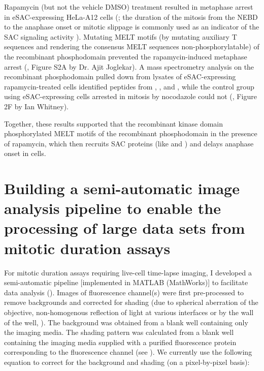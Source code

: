 Rapamycin (but not the vehicle DMSO) treatment resulted in metaphase arrest in eSAC-expressing HeLa-A12 cells (; the duration of the mitosis from the NEBD to the anaphase onset or mitotic slippage is commonly used as an indicator of the SAC signaling activity \cite{RiederNormalProgression, Rheostat, Ablation}). Mutating MELT motifs (by mutating auxiliary T\textOmega{} sequences \cite{RecombinantKNL1, MELTActivity} and rendering the consensus MELT sequences non-phosphorylatable) of the recombinant phosphodomain prevented the rapamycin-induced metaphase arrest (\cite{eSAC}, Figure S2A by Dr. Ajit Joglekar). A mass spectrometry analysis on the recombinant phosphodomain pulled down from lysates of eSAC-expressing rapamycin-treated cells identified peptides from , , and , while the control group using eSAC-expressing cells arrested in mitosis by nocodazole could not (\cite{eSAC}, Figure 2F by Ian Whitney).

Together, these results supported that the recombinant  kinase domain phosphorylated MELT motifs of the recombinant  phosphodomain in the presence of rapamycin, which then recruits SAC proteins (like  and ) and delays anaphase onset in cells.

\section{Building a semi-automatic image analysis pipeline to enable the processing of large data sets from mitotic duration assays}
\label{IncuCyteAnalysis}

For mitotic duration assays requiring live-cell time-lapse imaging, I developed a semi-automatic pipeline [implemented in MATLAB (MathWorks)] to facilitate data analysis (). Images of fluorescence channel(s) were first pre-processed to remove backgrounds and corrected for shading (due to spherical aberration of the objective, non-homogenous reflection of light at various interfaces or by the wall of the well, ). The background was obtained from a blank well containing only the imaging media. The shading pattern was calculated from a blank well containing the imaging media supplied with a purified fluorescence protein corresponding to the fluorescence channel (see ). We currently use the following equation to correct for the background and shading (on a pixel-by-pixel basis):

